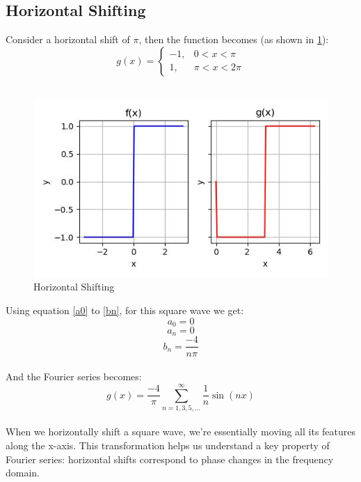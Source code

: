 \documentclass{article}
\begin{document}
\subsection{Horizontal Shifting}
Consider a horizontal shift of $\pi$, then the function becomes (as shown in \ref{fig2}):
\begin{equation}
g(x) = 
\begin{cases} 
-1, & 0 < x < \pi \\
1, & \pi < x < 2\pi
\end{cases}
\end{equation}\\
\begin{figure}
    \centering
    \includegraphics[width=\textwidth]{horizontal_shift.jpg}
    \caption{Horizontal Shifting}
    \label{fig2}
\end{figure}
Using equation \ref{a0} to \ref{bn}, for this square wave we get:
    \begin{equation}
    a_0 = 0
    \end{equation}
    \begin{equation}
    a_n = 0
    \end{equation}
    \begin{equation}
    b_n = \frac{-4}{n\pi}
    \end{equation}\\
And the Fourier series becomes:
\begin{equation}
g(x) = \frac{-4}{\pi} \sum_{n=1,3,5,...}^{\infty} \frac{1}{n} \sin\left(nx\right)
\end{equation}\\
When we horizontally shift a square wave, we're essentially moving all its features along the x-axis. This transformation helps us understand a key property of Fourier series: horizontal shifts correspond to phase changes in the frequency domain.\\
\end{document}
